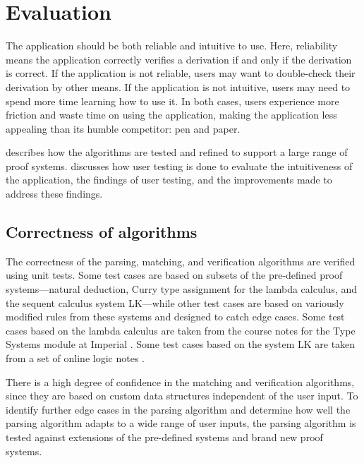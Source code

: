 \chapter{Evaluation}
The application should be both reliable and intuitive to use. Here, reliability means the application correctly verifies a derivation if and only if the derivation is correct. If the application is not reliable, users may want to double-check their derivation by other means. If the application is not intuitive, users may need to spend more time learning how to use it. In both cases, users experience more friction and waste time on using the application, making the application less appealing than its humble competitor: pen and paper.

 describes how the algorithms are tested and refined to support a large range of proof systems.  discusses how user testing is done to evaluate the intuitiveness of the application, the findings of user testing, and the improvements made to address these findings.

\section{Correctness of algorithms}
\label{evaluation:correctness}
The correctness of the parsing, matching, and verification algorithms are verified using unit tests. Some test cases are based on subsets of the pre-defined proof systems---natural deduction, Curry type assignment for the lambda calculus, and the sequent calculus system LK---while other test cases are based on variously modified rules from these systems and designed to catch edge cases. Some test cases based on the lambda calculus are taken from the course notes for the Type Systems module at Imperial \cite{van-bakel:2022}. Some test cases based on the system LK are taken from a set of online logic notes \cite{sequent}.

There is a high degree of confidence in the matching and verification algorithms, since they are based on custom data structures independent of the user input. To identify further edge cases in the parsing algorithm and determine how well the parsing algorithm adapts to a wide range of user inputs, the parsing algorithm is tested against extensions of the pre-defined systems and brand new proof systems.

